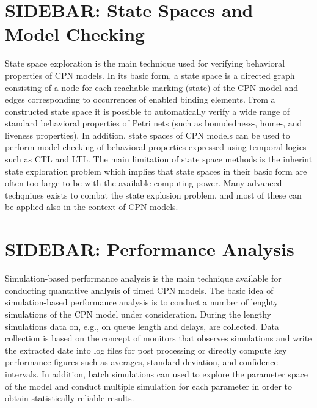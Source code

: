 \section*{SIDEBAR: State Spaces and Model Checking}

State space exploration is the main technique used for verifying
behavioral properties of CPN models. In its basic form, a state space
is a directed graph consisting of a node for each reachable marking
(state) of the CPN model and edges corresponding to occurrences of
enabled binding elements. From a constructed state space it is
possible to automatically verify a wide range of standard behavioral
properties of Petri nets (such as boundedness-, home-, and liveness
properties). In addition, state spaces of CPN models can be used to
perform model checking of behavioral properties expressed using
temporal logics such as CTL and LTL. The main limitation of state
space methods is the inherint state exploration problem which implies
that state spaces in their basic form are often too large to be with
the available computing power. Many advanced techqniues exists to
combat the state explosion problem, and most of these can be applied
also in the context of CPN models. 

\section*{SIDEBAR: Performance Analysis}

Simulation-based performance analysis is the main technique available
for conducting quantative analysis of timed CPN models. The basic idea
of simulation-based performance analysis is to conduct a number of
lenghty simulations of the CPN model under consideration. During the
lengthy simulations data on, e.g., on queue length and delays, are
collected. Data collection is based on the concept of monitors that
observes simulations and write the extracted date into log files for
post processing or directly compute key performance figures such as
averages, standard deviation, and confidence intervals. In addition,
batch simulations can used to explore the parameter space of the model
and conduct multiple simulation for each parameter in order to obtain
statistically reliable results.
